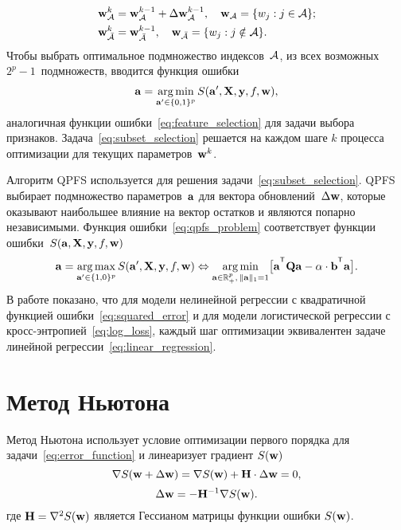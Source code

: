 \begin{align*}
\mathbf{w}_{\mathcal{A}}^k &= \mathbf{w}_{\mathcal{A}}^{k - 1} + \Delta \mathbf{w}_{\mathcal{A}}^{k - 1}, \quad \mathbf{w}_{\mathcal{A}} = \{w_j: j \in \mathcal{A} \}; \\
\mathbf{w}_{\bar{\mathcal{A}}}^k &= \mathbf{w}_{\bar{\mathcal{A}}}^{k - 1}, \quad \mathbf{w}_{\bar{\mathcal{A}}} = \{w_j: j \notin \mathcal{A} \}.
\end{align*}
Чтобы выбрать оптимальное подмножество индексов~$\mathcal{A}$, из всех возможных $2^p - 1$~подмножеств, вводится функция ошибки
\begin{equation}
\mathbf{a} = \mathop{\arg \min}\limits_{\mathbf{a}' \in \{0, 1\}^p} S(\mathbf{a}', \mathbf{X}, \mathbf{y}, f, \mathbf{w}),
\label{eq:subset_selection}
\end{equation}
аналогичная функции ошибки~\eqref{eq:feature_selection} для задачи выбора признаков. 
Задача~\eqref{eq:subset_selection} решается на каждом шаге $k$ процесса оптимизации для текущих параметров~$\mathbf{w}^k$.

Алгоритм QPFS используется для решения задачи~\eqref{eq:subset_selection}.
QPFS выбирает подмножество параметров~$\mathbf{a}$ для вектора обновлений~$ \Delta \mathbf{w}$, которые оказывают наибольшее влияние на вектор остатков и являются попарно независимыми.
Функция ошибки~\eqref{eq:qpfs_problem} соответствует функции ошибки~$S(\mathbf{a}, \mathbf{X}, \mathbf{y}, f, \mathbf{w})$
\begin{equation}
\ba = \argmax_{\ba' \in \{1, 0\}^p} S(\ba', \bX, \by, f, \bw) \Leftrightarrow \argmin_{\ba  \in \bbR^p_+, \, \|\ba\|_1=1} \bigl[\ba^{\T} \bQ \ba - \alpha \cdot \mathbf{b}^{\T} \ba \bigr].
\end{equation}
В работе показано, что для модели нелинейной регрессии с квадратичной функцией ошибки~\eqref{eq:squared_error} и для модели логистической регрессии с кросс-энтропией~\eqref{eq:log_loss}, каждый шаг оптимизации эквивалентен задаче линейной регрессии~\eqref{eq:linear_regression}.



\section{Метод Ньютона}

Метод Ньютона использует условие оптимизации первого порядка для задачи~\eqref{eq:error_function} и линеаризует градиент $S (\mathbf{w})$
\[
\nabla S (\mathbf{w} + \Delta \mathbf{w}) = \nabla S(\mathbf{w}) + \mathbf{H} \cdot \Delta \mathbf{w} = 0,
\]
\[
\Delta \mathbf{w} = - \mathbf{H}^{-1} \nabla S(\mathbf{w}).
\]
где $\mathbf{H} = \nabla^2 S(\mathbf{w})$ является Гессианом матрицы функции ошибки $S(\mathbf{w})$.

